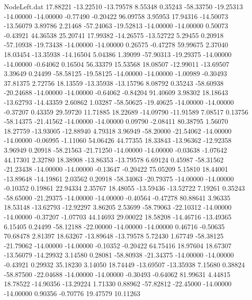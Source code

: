 \begin{filecontents}{NodeLeft.dat}
  17.88221  -13.22510  -13.79578     8.55348    0.35243  -58.33750  -19.25313  -14.00000  -14.00000   -0.77490   -0.20422   96.09758    3.95953
  17.94316  -14.50073  -13.56079     3.89786    2.21468  -57.24063  -19.52813  -14.00000  -14.00000    0.50073   -0.43921   44.36538   25.20741
  17.99382  -14.26575  -13.52722     5.29455    0.20918  -57.10938  -19.73438  -14.00000  -14.00000    0.26575   -0.47278   59.99675    2.37040
  18.03454  -13.35938  -14.16504     5.04386    1.39099  -57.90313  -19.29375  -14.00000  -14.00000   -0.64062    0.16504   56.33379   15.53568
  18.08507  -12.99011  -13.69507     3.39649    0.24499  -58.58125  -19.58125  -14.00000  -14.00000   -1.00989   -0.30493   37.81375    2.72756
  18.13559  -13.35938  -13.15796     8.08792    0.35243  -58.60938  -20.24688  -14.00000  -14.00000   -0.64062   -0.84204   91.40609    3.98302
  18.18643  -13.62793  -14.43359     2.60862    1.03287  -58.50625  -19.40625  -14.00000  -14.00000   -0.37207    0.43359   29.59720   11.71885
  18.22689  -14.09790  -11.91589     7.08517    0.13756  -58.14375  -21.41562  -14.00000  -14.00000    0.09790   -2.08411   80.38795    1.56070
  18.27759  -13.93005  -12.88940     4.79318    3.96949  -58.20000  -21.54062  -14.00000  -14.00000   -0.06995   -1.11060   54.06426   44.77355
  18.33843  -13.96362  -12.92358     3.96949    0.20918  -58.21563  -21.71250  -14.00000  -14.00000   -0.03638   -1.07642   44.17301    2.32780
  18.38908  -13.86353  -13.79578     6.69124    0.45987  -58.31562  -21.23438  -14.00000  -14.00000   -0.13647   -0.20422   75.05209    5.15810
  18.44001  -13.89648  -14.19861     2.03562    0.20918  -58.34063  -20.79375  -14.00000  -14.00000   -0.10352    0.19861   22.94334    2.35767
  18.48055  -13.59436  -13.52722     7.19261    0.35243  -58.65000  -21.29375  -14.00000  -14.00000   -0.40564   -0.47278   80.88641    3.96335
  18.53148  -13.62793  -12.92297     3.86205    2.53699  -58.79063  -22.10312  -14.00000  -14.00000   -0.37207   -1.07703   44.14693   29.00022
  18.58208  -14.46716  -13.49365     6.15405    0.24499  -58.12188  -22.00000  -14.00000  -14.00000    0.46716   -0.50635   70.68478    2.81397
  18.63267  -13.89648  -13.79578     5.72430    1.67749  -58.38125  -21.79062  -14.00000  -14.00000   -0.10352   -0.20422   64.75416   18.97604
  18.67307  -13.56079  -14.29932     3.14580    0.28081  -58.80938  -21.34375  -14.00000  -14.00000   -0.43921    0.29932   35.18230    3.14050
  18.74449  -13.69507  -13.35938     7.15680    0.38824  -58.87500  -22.04688  -14.00000  -14.00000   -0.30493   -0.64062   81.99631    4.44815
  18.78522  -14.90356  -13.29224     1.71330    0.88962  -57.82812  -22.45000  -14.00000  -14.00000    0.90356   -0.70776   19.47579   10.11263

\end{filecontents}
